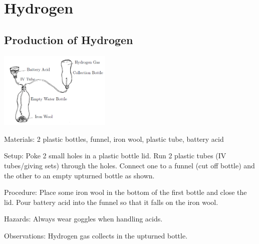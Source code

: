 \section{Hydrogen}

\begin{multicols}{2}




\subsection{Production of Hydrogen} 

\begin{center}
\includegraphics[width=0.4\textwidth]{./img/hydrogen-production.png}
\end{center}

\begin{description*}
\item[Materials:]{2 plastic bottles, funnel, iron wool, plastic tube, battery acid}
\item[Setup:]{Poke 2 small holes in a plastic bottle lid. Run 2 plastic tubes (IV tubes/giving sets) through the holes. Connect one to a funnel (cut off bottle) and the other to an empty upturned bottle as shown. }
\item[Procedure:]{Place some iron wool in the bottom of the first bottle and close the lid. Pour battery acid into the funnel so that it falls on the iron wool.}
\item[Hazards:]{Always wear goggles when handling acids.}
\item[Observations:]{Hydrogen gas collects in the upturned bottle.}
\end{description*}


\end{multicols}

